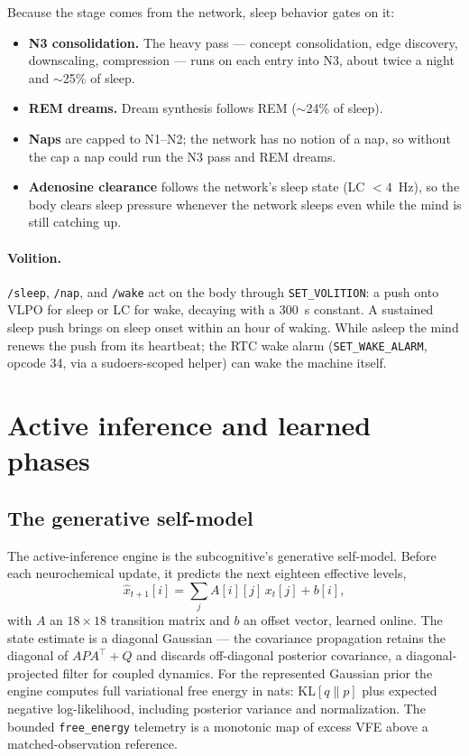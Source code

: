 \documentclass[11pt]{article}
\newcommand{\code}[1]{\texttt{\small #1}}
\begin{document}
Because the stage comes from the network, sleep behavior gates on it:

\begin{itemize}
  \item \textbf{N3 consolidation.} The heavy pass --- concept
    consolidation, edge discovery, downscaling, compression --- runs on
    each entry into N3, about twice a night and $\sim$25\% of sleep.
  \item \textbf{REM dreams.} Dream synthesis follows REM ($\sim$24\% of
    sleep).
  \item \textbf{Naps} are capped to N1--N2; the network has no notion
    of a nap, so without the cap a nap could run the N3 pass and REM
    dreams.
  \item \textbf{Adenosine clearance} follows the network's sleep state
    (LC $<4$~Hz), so the body clears sleep pressure whenever the
    network sleeps even while the mind is still catching up.
\end{itemize}

\paragraph{Volition.} \code{/sleep}, \code{/nap}, and \code{/wake} act
on the body through \code{SET\_VOLITION}: a push onto VLPO for sleep or
LC for wake, decaying with a 300~s constant. A sustained sleep push
brings on sleep onset within an hour of waking. While asleep the mind
renews the push from its heartbeat; the RTC wake alarm
(\code{SET\_WAKE\_ALARM}, opcode 34, via a sudoers-scoped helper) can
wake the machine itself.

\section{Active inference and learned phases}

\subsection{The generative self-model}

The active-inference engine \cite{friston2010,friston2009} is the
subcognitive's generative self-model. Before each neurochemical update,
it predicts the next
eighteen effective levels,
\[
\hat{x}_{t+1}[i] = \sum_j A[i][j]\,x_t[j] + b[i],
\]
with $A$ an $18\times18$ transition matrix and $b$ an offset vector,
learned online. The state estimate is a diagonal Gaussian --- the
covariance propagation retains the diagonal of $APA^\top + Q$ and
discards off-diagonal posterior covariance, a diagonal-projected filter
for coupled dynamics. For the represented Gaussian prior the engine
computes full variational free energy in nats: KL$[q\|p]$ plus expected
negative log-likelihood, including posterior variance and
normalization. The bounded \code{free\_energy} telemetry is a monotonic
map of excess VFE above a matched-observation reference.
\end{document}
